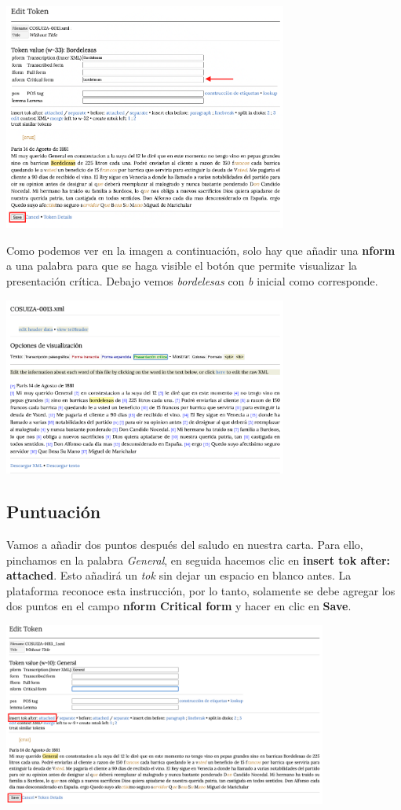 \documentclass[
]{book}
\begin{document}
\includegraphics[width=0.7\textwidth,height=\textheight]{img/edit.png}

Como podemos ver en la imagen a continuación, solo hay que añadir una \textbf{nform} a una palabra para que se haga visible el botón que permite visualizar la presentación crítica. Debajo vemos \emph{bordelesas} con \emph{b} inicial como corresponde.

\includegraphics[width=0.7\textwidth,height=\textheight]{img/PCviz.png}

\hypertarget{puntuaciuxf3n}{%
\subsection*{Puntuación}\label{puntuaciuxf3n}}

Vamos a añadir dos puntos después del saludo en nuestra carta. Para ello, pinchamos en la palabra \emph{General}, en seguida hacemos clic en \textbf{insert tok after: attached}. Esto añadirá un \emph{tok} sin dejar un espacio en blanco antes. La plataforma reconoce esta instrucción, por lo tanto, solamente se debe agregar los dos puntos en el campo \textbf{nform Critical form} y hacer en clic en \textbf{Save}.

\includegraphics[width=0.8\textwidth,height=\textheight]{img/add.png}
\end{document}
